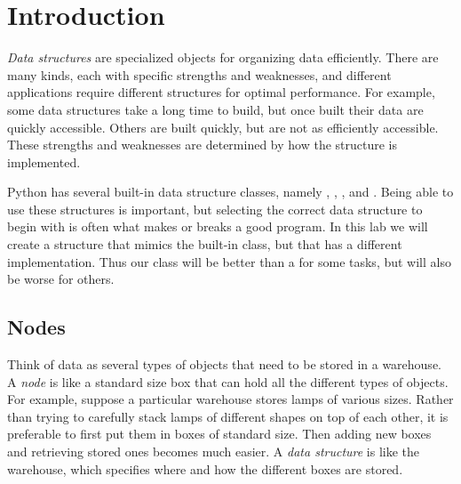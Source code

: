 \label{lab:Python_DataStructures}


\section*{Introduction}

\emph{Data structures} are specialized objects for organizing data efficiently.
There are many kinds, each with specific strengths and weaknesses, and different applications require different structures for optimal performance.
For example, some data structures take a long time to build, but once built their data are quickly accessible.
Others are built quickly, but are not as efficiently accessible.
These strengths and weaknesses are determined by how the structure is implemented.

Python has several built-in data structure classes, namely , , , and .
Being able to use these structures is important, but selecting the correct data structure to begin with is often what makes or breaks a good program.
In this lab we will create a structure that mimics the built-in  class, but that has a different implementation.
Thus our class will be better than a  for some tasks, but will also be worse for others.

\subsection*{Nodes}

Think of data as several types of objects that need to be stored in a warehouse.
A \emph{node} is like a standard size box that can hold all the different types of objects.
For example, suppose a particular warehouse stores lamps of various sizes.
Rather than trying to carefully stack lamps of different shapes on top of each other, it is preferable to first put them in boxes of standard size.
Then adding new boxes and retrieving stored ones becomes much easier.
A \emph{data structure} is like the warehouse, which specifies where and how the different boxes are stored.

